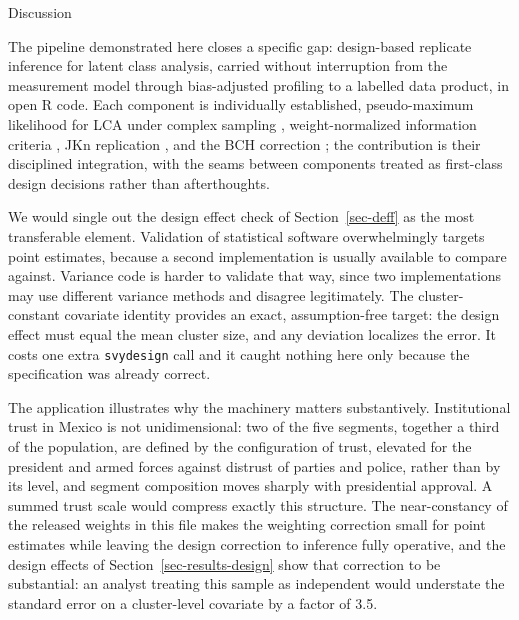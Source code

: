 \documentclass[
  12pt]{article}
\begin{document}
Discussion

The pipeline demonstrated here closes a specific gap: design-based
replicate inference for latent class analysis, carried without
interruption from the measurement model through bias-adjusted profiling
to a labelled data product, in open R code. Each component is
individually established, pseudo-maximum likelihood for LCA under
complex sampling \citep{patterson2002, vermunt2007}, weight-normalized
information criteria \citep{lumley2015}, JKn replication
\citep{wolter2007}, and the BCH correction
\citep{bolck2004, vermunt2010}; the contribution is their disciplined
integration, with the seams between components treated as first-class
design decisions rather than afterthoughts.

We would single out the design effect check of Section~\ref{sec-deff} as
the most transferable element. Validation of statistical software
overwhelmingly targets point estimates, because a second implementation
is usually available to compare against. Variance code is harder to
validate that way, since two implementations may use different variance
methods and disagree legitimately. The cluster-constant covariate
identity provides an exact, assumption-free target: the design effect
must equal the mean cluster size, and any deviation localizes the error.
It costs one extra \texttt{svydesign} call and it caught nothing here
only because the specification was already correct.

The application illustrates why the machinery matters substantively.
Institutional trust in Mexico is not unidimensional: two of the five
segments, together a third of the population, are defined by the
configuration of trust, elevated for the president and armed forces
against distrust of parties and police, rather than by its level, and
segment composition moves sharply with presidential approval. A summed
trust scale would compress exactly this structure. The near-constancy of
the released weights in this file makes the weighting correction small
for point estimates while leaving the design correction to inference
fully operative, and the design effects of
Section~\ref{sec-results-design} show that correction to be substantial:
an analyst treating this sample as independent would understate the
standard error on a cluster-level covariate by a factor of 3.5.
\end{document}

